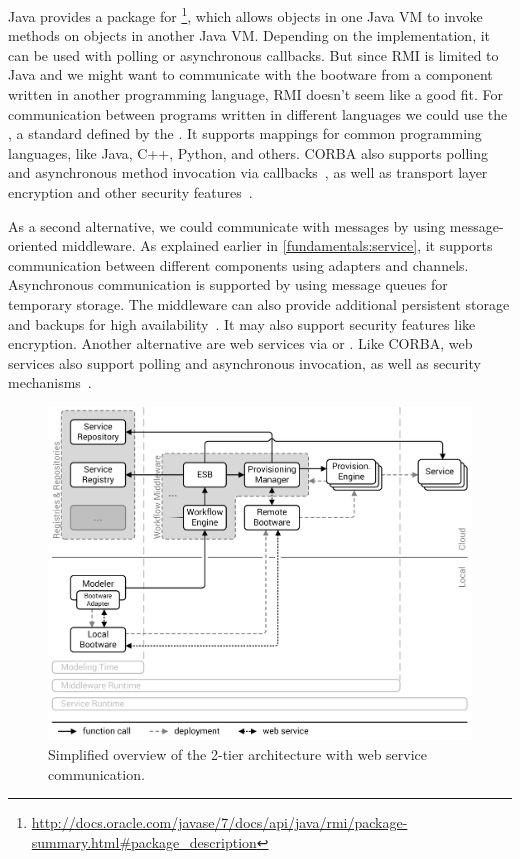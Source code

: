 Java provides a package for \footnote{\url{http://docs.oracle.com/javase/7/docs/api/java/rmi/package-summary.html\#package_description}}, which allows objects in one Java VM to invoke methods on objects in another Java VM.
Depending on the implementation, it can be used with polling or asynchronous callbacks.
But since RMI is limited to Java and we might want to communicate with the bootware from a component written in another programming language, RMI doesn't seem like a good fit.
For communication between programs written in different languages we could use the , a standard defined by the .
It supports mappings for common programming languages, like Java, C++, Python, and others.
CORBA also supports polling and asynchronous method invocation via callbacks~\autocite{corba:async}, as well as transport layer encryption and other security features~\autocite{corba:security}.

As a second alternative, we could communicate with messages by using message-oriented middleware.
As explained earlier in \autoref{fundamentals:service}, it supports communication between different components using adapters and channels.
Asynchronous communication is supported by using message queues for temporary storage.
The middleware can also provide additional persistent storage and backups for high availability~\autocite{mom}.
It may also support security features like encryption.
Another alternative are web services via  or .
Like CORBA, web services also support polling and asynchronous invocation, as well as security mechanisms~\autocite{ws:security}.

\begin{figure}[!htbp]
	\centering
	\includegraphics[resolution=600]{design/assets/webservice}
	\caption{Simplified overview of the 2-tier architecture with web service communication.}
	\label{image:webservice}
\end{figure}

